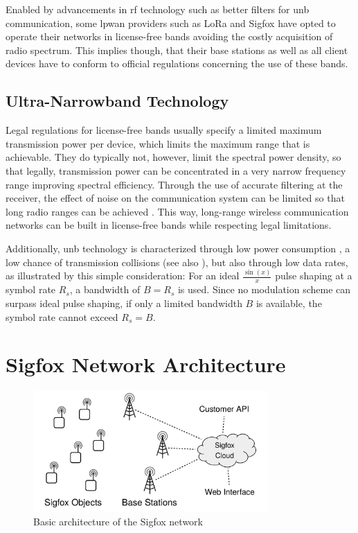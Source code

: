 \FloatBarrier
Enabled by advancements in \gls{rf} technology such as better filters for \gls{unb} communication, some \gls{lpwan} providers such as LoRa and Sigfox have opted to operate their networks in license-free bands avoiding the costly acquisition of radio spectrum.
This implies though, that their base stations as well as all client devices have to conform to official regulations concerning the use of these bands.

\subsection{Ultra-Narrowband Technology}
Legal regulations for license-free bands usually specify a limited maximum transmission power per device, which limits the maximum range that is achievable.
They do typically not, however, limit the spectral power density, so that legally, transmission power can be concentrated in a very narrow frequency range improving spectral efficiency.
Through the use of accurate filtering at the receiver, the effect of noise on the communication system can be limited so that long radio ranges can be achieved \cite[Section 3.3]{phyandmac} \cite[Section 2.1]{lpwan_comparison}.
This way, long-range wireless communication networks can be built in license-free bands while respecting legal limitations.

Additionally, \gls{unb} technology is characterized through low power consumption \cite[Section 2.1]{lpwan_comparison}, a low chance of transmission collisions (see also ), but also through low data rates, as illustrated by this simple consideration:
For an ideal $\frac{\sin \left( x \right)}{x}$ pulse shaping at a symbol rate $R_s$, a bandwidth of $B = R_s$ is used.
Since no modulation scheme can surpass ideal pulse shaping, if only a limited bandwidth $B$ is available, the symbol rate cannot exceed $R_s = B$.

\FloatBarrier
\section{Sigfox Network Architecture}
\begin{figure}[h]
	\centering
	\includegraphics[width=0.8\textwidth]{fig/NetworkLayout.pdf}
	\caption{Basic architecture of the Sigfox network}
	\label{fig:network_architecture}
\end{figure}

